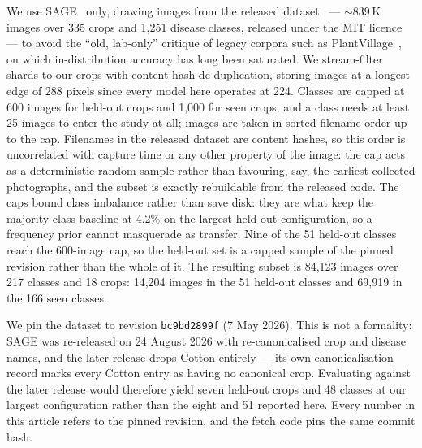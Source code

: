 \documentclass[a4paper,fleqn]{cas-dc}
\begin{document}
We use SAGE~\citep{arshad2026sage} only, drawing images from the released
dataset~\citep{sagedata2026} --- $\sim$839\,K images over 335 crops and 1{,}251 disease classes,
released under the MIT licence --- to avoid the
``old, lab-only'' critique of legacy corpora such as PlantVillage~\citep{mohanty2016}, on which
in-distribution accuracy has long been saturated. We stream-filter shards to our crops with
content-hash de-duplication, storing images at a longest edge of 288 pixels since every model
here operates at 224. Classes are capped at 600 images for held-out crops and 1{,}000 for seen
crops, and a class needs at least 25 images to enter the study at all; images are taken in sorted
filename order up to the cap. Filenames in the released dataset are content hashes, so this order
is uncorrelated with capture time or any other property of the image: the cap acts as a
deterministic random sample rather than favouring, say, the earliest-collected photographs, and
the subset is exactly rebuildable from the released code. The caps bound class imbalance rather than save disk: they are what keep the majority-class
baseline at 4.2\% on the largest held-out configuration, so a frequency prior cannot masquerade as
transfer. Nine of the 51 held-out classes reach the 600-image cap, so the held-out set is a
capped sample of the pinned revision rather than the whole of it. The resulting subset is 84{,}123
images over 217 classes and 18 crops: 14{,}204 images in the 51 held-out classes and 69{,}919 in
the 166 seen classes.

We pin the dataset to revision \texttt{bc9bd2899f} (7 May 2026). This is not a formality: SAGE was
re-released on 24 August 2026 with re-canonicalised crop and disease names, and the later release
drops Cotton entirely --- its own canonicalisation record marks every Cotton entry as having no
canonical crop. Evaluating against the later release would therefore yield seven held-out crops and
48 classes at our largest configuration rather than the eight and 51 reported here. Every number in
this article refers to the pinned revision, and the fetch code pins the same commit hash.
\end{document}
